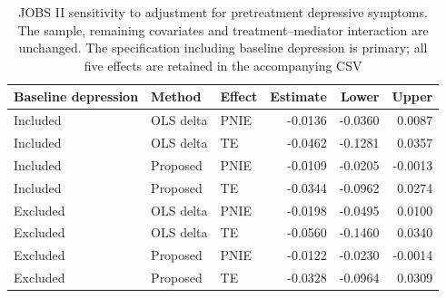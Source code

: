 \begin{table}[htbp]
\centering
\small
\caption{JOBS II sensitivity to adjustment for pretreatment depressive symptoms. The sample, remaining covariates and treatment--mediator interaction are unchanged. The specification including baseline depression is primary; all five effects are retained in the accompanying CSV}
\label{tab:application_covariates}
\begin{tabular}{lllrrr}
\toprule
Baseline depression & Method & Effect & Estimate & Lower & Upper \\
\midrule
Included & OLS delta & PNIE & -0.0136 & -0.0360 & 0.0087 \\
Included & OLS delta & TE & -0.0462 & -0.1281 & 0.0357 \\
Included & Proposed & PNIE & -0.0109 & -0.0205 & -0.0013 \\
Included & Proposed & TE & -0.0344 & -0.0962 & 0.0274 \\
Excluded & OLS delta & PNIE & -0.0198 & -0.0495 & 0.0100 \\
Excluded & OLS delta & TE & -0.0560 & -0.1460 & 0.0340 \\
Excluded & Proposed & PNIE & -0.0122 & -0.0230 & -0.0014 \\
Excluded & Proposed & TE & -0.0328 & -0.0964 & 0.0309 \\
\bottomrule
\end{tabular}
\end{table}
